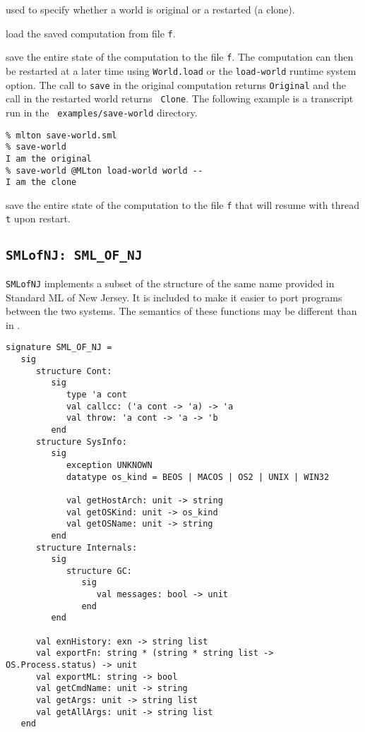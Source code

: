 \begin{description}
used to specify whether a world is original or a restarted (a clone).

load the saved computation from file {\tt f}.

save the entire state of the computation to
the file {\tt f}.  The computation can then be restarted at a later
time using {\tt World.load} or the {\tt load-world} runtime system
option.  The call to {\tt save} in the original computation returns
{\tt Original} and the call in the restarted world returns {\tt
Clone}.  The following example is a transcript run in the {\tt
examples/save-world} directory.
\begin{verbatim}
% mlton save-world.sml
% save-world
I am the original
% save-world @MLton load-world world --
I am the clone
\end{verbatim}

save the entire state of the computation to
the file {\tt f} that will resume with thread {\tt t} upon restart.

\end{description}

\subsection{{\tt SMLofNJ: SML\_OF\_NJ}}

{\tt SMLofNJ} implements a subset of the structure of the same name
provided in Standard ML of New Jersey.  It is included to make it
easier to port programs between the two systems.  The semantics of
these functions may be different than in {\smlnj}.

\begin{verbatim}
signature SML_OF_NJ =
   sig
      structure Cont:
         sig
            type 'a cont
            val callcc: ('a cont -> 'a) -> 'a
            val throw: 'a cont -> 'a -> 'b
         end
      structure SysInfo:
         sig
            exception UNKNOWN
            datatype os_kind = BEOS | MACOS | OS2 | UNIX | WIN32

            val getHostArch: unit -> string
            val getOSKind: unit -> os_kind
            val getOSName: unit -> string
         end
      structure Internals:
         sig
            structure GC:
               sig
                  val messages: bool -> unit
               end             
         end

      val exnHistory: exn -> string list
      val exportFn: string * (string * string list -> OS.Process.status) -> unit
      val exportML: string -> bool
      val getCmdName: unit -> string
      val getArgs: unit -> string list
      val getAllArgs: unit -> string list
   end
\end{verbatim}

